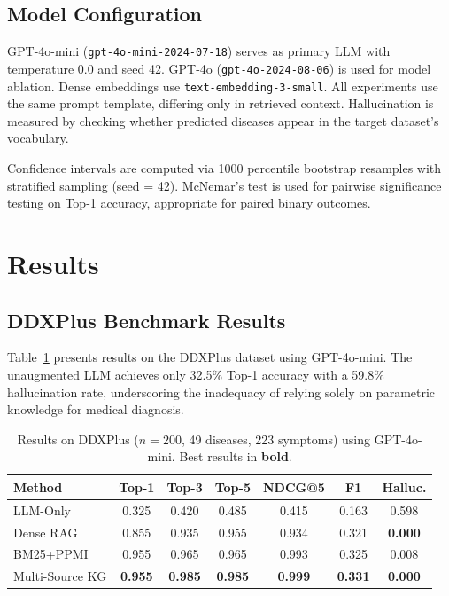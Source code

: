 \documentclass[preprint,12pt]{elsarticle}
\begin{document}
\subsection{Model Configuration}

GPT-4o-mini (\texttt{gpt-4o-mini-2024-07-18}) serves as primary LLM with temperature 0.0 and seed 42. GPT-4o (\texttt{gpt-4o-2024-08-06}) is used for model ablation. Dense embeddings use \texttt{text-embedding-3-small}. All experiments use the same prompt template, differing only in retrieved context. Hallucination is measured by checking whether predicted diseases appear in the target dataset's vocabulary.

Confidence intervals are computed via 1000 percentile bootstrap resamples with stratified sampling (seed = 42). McNemar's test is used for pairwise significance testing on Top-1 accuracy, appropriate for paired binary outcomes.

\section{Results}
\label{sec:results}

\subsection{DDXPlus Benchmark Results}

Table~\ref{tab:ddxplus} presents results on the DDXPlus dataset using GPT-4o-mini. The unaugmented LLM achieves only 32.5\% Top-1 accuracy with a 59.8\% hallucination rate, underscoring the inadequacy of relying solely on parametric knowledge for medical diagnosis.

\begin{table}[t]
\centering
\caption{Results on DDXPlus ($n{=}200$, 49 diseases, 223 symptoms) using GPT-4o-mini. Best results in \textbf{bold}.}
\label{tab:ddxplus}
\begin{tabular}{lcccccc}
\toprule
\textbf{Method} & \textbf{Top-1} & \textbf{Top-3} & \textbf{Top-5} & \textbf{NDCG@5} & \textbf{F1} & \textbf{Halluc.} \\
\midrule
LLM-Only       & 0.325 & 0.420 & 0.485 & 0.415 & 0.163 & 0.598 \\
Dense RAG       & 0.855 & 0.935 & 0.955 & 0.934 & 0.321 & \textbf{0.000} \\
BM25+PPMI       & 0.955 & 0.965 & 0.965 & 0.993 & 0.325 & 0.008 \\
Multi-Source KG & \textbf{0.955} & \textbf{0.985} & \textbf{0.985} & \textbf{0.999} & \textbf{0.331} & \textbf{0.000} \\
\bottomrule
\end{tabular}
\end{table}
\end{document}
